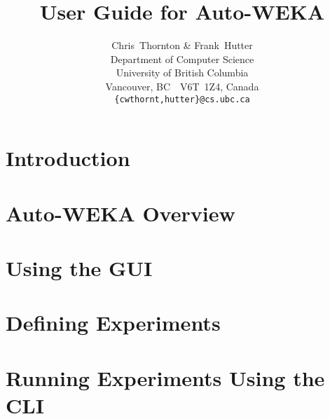 \documentclass[11pt,letterpaper,oneside]{article}
\begin{document}
\title{User Guide for Auto-WEKA }

\author{
Chris~Thornton \& Frank~Hutter\\
Department of Computer Science\\
University of British Columbia\\
Vancouver, BC\ \ V6T~1Z4, Canada\\
\texttt{\{cwthornt,hutter\}@cs.ubc.ca}
}

\maketitle

\tableofcontents

\section{Introduction}\label{sec:intro}



\section{Auto-WEKA Overview}\label{sec:overview}


\section{Using the GUI}\label{sec:gui}



\section{Defining Experiments}\label{sec:defining}

 
\section{Running Experiments Using the CLI}\label{sec:running}

 
\end{document}
